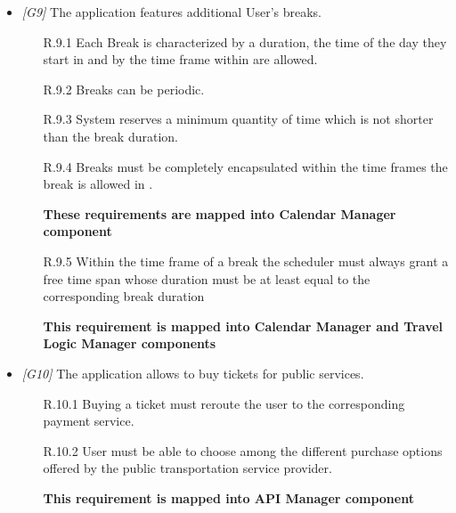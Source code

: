 \begin{itemize}
\begin{itemize}
		\end{itemize}





	\item \textit{[G9]} The application features additional User’s breaks.

		\begin{itemize}

			\item [R.9.1] Each Break is characterized by a duration, the time of the day they start in and by the time frame within are allowed.

			\item[R.9.2] Breaks can be periodic.

			\item[R.9.3] System reserves a minimum quantity of time which is not shorter than the break duration.

			\item[R.9.4] Breaks must be completely encapsulated within the time frames the break is allowed in	.
			
			\textbf{These requirements are mapped into Calendar Manager component}
			
			\item[R.9.5] Within the time frame of a break the scheduler must always grant a free time span whose duration must be at least equal to the corresponding break duration
			
			\textbf{This requirement is mapped into Calendar Manager and Travel Logic Manager components}

		\end{itemize}





	\item \textit{[G10]} The application allows to buy tickets for public services.

		\begin{itemize}

			\item[R.10.1] Buying a ticket must reroute the user to the corresponding payment service.

			\item[R.10.2] User must be able to choose among the different purchase options offered by the public transportation service provider.
			
			\textbf{This requirement is mapped into API Manager component}


\end{itemize}
\end{itemize}
